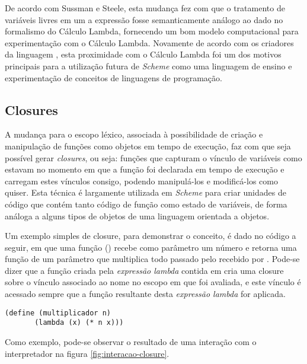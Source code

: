 De acordo com Sussman e Steele\cite{first-report}, esta mudança fez com que o tratamento de
variáveis livres em um a expressão fosse semanticamente análogo ao dado no
formalismo do Cálculo Lambda, fornecendo um bom modelo computacional para
experimentação com o Cálculo Lambda. Novamente de acordo com os criadores da
linguagem \cite{first-report}, esta proximidade com o Cálculo Lambda foi um dos motivos
principais para a utilização futura de \textit{Scheme} como uma linguagem de
ensino e experimentação de conceitos de linguagens de programação.

\subsection{Closures}

A mudança para o escopo léxico, associada à possibilidade de criação e
manipulação de funções como objetos em tempo de execução, faz com que seja
possível gerar \textit{closures}, ou seja: funções que capturam o vínculo de
variáveis como estavam no momento em que a função foi declarada em tempo de
execução e carregam estes vínculos consigo, podendo manipulá-los e modificá-los
como quiser. Esta técnica é largamente utilizada em \textit{Scheme} para criar
unidades de código que contém tanto código de função como estado de variáveis,
de forma análoga a alguns tipos de objetos de uma linguagem orientada a
objetos.

Um exemplo simples de closure, para demonstrar o conceito, é dado no código a
seguir, em que uma função () recebe como parâmetro um
número  e retorna uma função de um parâmetro  que multiplica
todo  passado pelo  recebido por . Pode-se
dizer que a função criada pela \textit{expressão lambda} contida em
 cria uma closure sobre o vínculo associado ao nome 
no escopo em que foi avaliada, e este vínculo é acessado sempre que a função
resultante desta \textit{expressão lambda} for aplicada.

\begin{lstlisting}[frame=none]
    (define (multiplicador n)
       (lambda (x) (* n x)))
\end{lstlisting}

Como exemplo, pode-se observar o resultado de uma interação com o interpretador
na figura \ref{fig:interacao-closure}.

